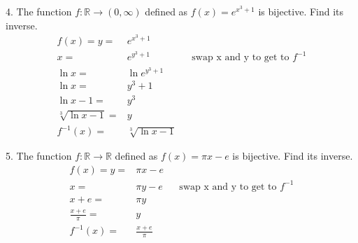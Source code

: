 \documentclass{article}
\begin{document}
\begin{exercise}{}{}
	{4. The function $f: \mathbb{R} \rightarrow(0, \infty)$ defined
		as $f(x)=e^{x^3+1}$ is bijective. Find its inverse.}
	\begin{align*}
		f(x)=y=            & e^{x^3+1}                                                   \\
		x=                 & e^{y^3+1}         &  & \text{swap x and y to get to }f^{-1} \\
		\ln x=             & \ln e^{y^3+1}                                               \\
		\ln x=             & y^3+1                                                       \\
		\ln x-1=           & y^3                                                         \\
		\sqrt[3]{\ln x-1}= & y                                                           \\
		f^{-1}(x) =        & \sqrt[3]{\ln x-1}
	\end{align*}
\end{exercise}{}{}

\begin{exercise}{}{}
	{5. The function $f: \mathbb{R} \rightarrow \mathbb{R}$ defined
		as $f(x)=\pi x-e$ is bijective. Find its inverse.}
	\begin{align*}
		f(x)=y=          & \pi x-e                                                   \\
		x=               & \pi y-e         &  & \text{swap x and y to get to }f^{-1} \\
		x+e=             & \pi y                                                     \\
		\frac{x+e}{\pi}= & y                                                         \\
		f^{-1}(x) =      & \frac{x+e}{\pi}
	\end{align*}
\end{exercise}{}{}
\end{document}
